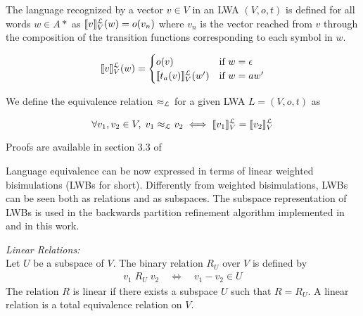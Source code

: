 \begin{defn}
  The language recognized by a vector $v \in V$ in an LWA $(V,o,t)$ is defined
  for all words $w \in A*$ as $\llbracket v\rrbracket^\mathcal{L}_{V}(w) = o(v_n)$ where $v_n$ is the 
  vector reached from $v$ through the composition of the transition functions
  corresponding to each symbol in $w$.
  
  \begin{equation*}
    \begin{aligned}
      \llbracket v\rrbracket^\mathcal{L}_{V}(w) = \begin{cases}
        o(v) & \text{if } w = \epsilon \\ 
        \llbracket t_a(v)\rrbracket^\mathcal{L}_{V}(w') & \text{if } w = aw' 
      \end{cases}
    \end{aligned}
  \end{equation*}
  
\end{defn}


We define the equivalence relation  $\approx_{\mathcal{L}}$ for a given LWA $L = (V, o, t)$ as 

\begin{equation}
  \forall v_1, v_2 \in V, \; v_1 \approx_{\mathcal{L}} v_2 \iff \llbracket v_1\rrbracket^\mathcal{L}_{V} = \llbracket v_2\rrbracket^\mathcal{L}_{V}
\end{equation}

Proofs are available in section 3.3 of \cite{BONCHI201277}

Language equivalence can be now expressed in terms of linear weighted 
bisimulations (LWBs for short).
Differently from weighted bisimulations, LWBs can be seen both as relations 
and as subspaces.
The subspace representation of LWBs is used in the backwards partition 
refinement algorithm 
implemented in \cite{BONCHI201277} and in this work.

\begin{defn}
  \label{def:linrel}
  \textit{Linear Relations:}\\
  Let $U$ be a subspace of $V$. The binary relation $R_U$ over $V$ is defined by
  \begin{equation*}
    \begin{aligned}
      v_1 \; R_U \; v_2 \quad \iff \quad v_1 - v_2 \in U
    \end{aligned}
  \end{equation*}
  The relation $R$ is linear if there exists a subspace $U$ such that $R = R_U$.
  A linear relation is a total equivalence relation on $V$.
\end{defn}

